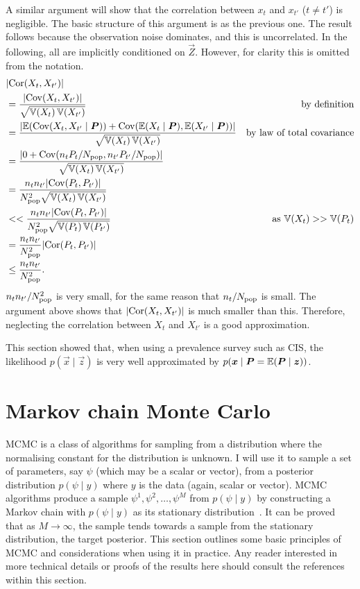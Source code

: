 \documentclass[thesis.tex]{subfiles}
\begin{document}
A similar argument will show that the correlation between $x_t$ and $x_{t'}$ ($t \neq t'$) is negligible.
The basic structure of this argument is as the previous one.
The result follows because the observation noise dominates, and this is uncorrelated.
In the following, all are implicitly conditioned on $\vec{Z}$.
However, for clarity this is omitted from the notation.
\begin{align}
  &\lvert \operatorname{Cor}(X_t, X_{t'}) \rvert \\
  &= \frac{\lvert\operatorname{Cov}(X_t, X_{t'})\rvert}{\sqrt{\operatorname{\mathbb{V}}(X_t) \operatorname{\mathbb{V}}(X_{t'})}} &\text{by definition}\\
  &= \frac{\lvert \operatorname{\mathbb{E}}(\operatorname{Cov}(X_t, X_{t'} \mid \bm{P})) + \operatorname{Cov}(\operatorname{\mathbb{E}}(X_t \mid \bm{P}), \operatorname{\mathbb{E}}(X_{t'} \mid \bm{P})) \rvert}{\sqrt{\operatorname{\mathbb{V}}(X_t) \operatorname{\mathbb{V}}(X_{t'})}} &\text{by law of total covariance} \\
  &= \frac{\lvert 0 + \operatorname{Cov}(n_t P_t / N_\text{pop}, n_{t'} P_{t'} / N_\text{pop}) \rvert}{\sqrt{\operatorname{\mathbb{V}}(X_t) \operatorname{\mathbb{V}}(X_{t'})}} \\
  &= \frac{n_t n_{t'} \lvert \operatorname{Cov}(P_t, P_{t'}) \rvert}{N_\text{pop}^2 \sqrt{\operatorname{\mathbb{V}}(X_t) \operatorname{\mathbb{V}}(X_{t'})}}  \\
  &<< \frac{n_t n_{t'} \lvert \operatorname{Cov}(P_t, P_{t'}) \rvert}{N_\text{pop}^2 \sqrt{\operatorname{\mathbb{V}}(P_t) \operatorname{\mathbb{V}}(P_{t'})}} &\text{as $\operatorname{\mathbb{V}}(X_t) >> \operatorname{\mathbb{V}}(P_t)$} \\
  &= \frac{n_t n_{t'}}{N_\text{pop}^2} \lvert \operatorname{Cor}(P_t, P_{t'}) \rvert \\
  &\leq \frac{n_t n_{t'}}{N_\text{pop}^2}.
\end{align}
$n_t n_{t'} / N_\text{pop}^2$ is very small, for the same reason that $n_t / N_\text{pop}$ is small.
The argument above shows that $\lvert \operatorname{Cor}(X_t, X_{t'}) \rvert$ is much smaller than this.
Therefore, neglecting the correlation between $X_t$ and $X_{t'}$ is a good approximation.

This section showed that, when using a prevalence survey such as CIS, the likelihood $p(\vec{x} \mid \vec{z})$ is very well approximated by $p(\bm{x} \mid \bm{P} = \operatorname{\mathbb{E}}(\bm{P} \mid \bm{z}))$.


\section{Markov chain Monte Carlo} \label{inc-prev:sec:MCMC}

MCMC is a class of algorithms for sampling from a distribution where the normalising constant for the distribution is unknown.
I will use it to sample a set of parameters, say $\psi$ (which may be a scalar or vector), from a posterior distribution $p(\psi \mid y)$ where $y$ is the data (again, scalar or vector).
MCMC algorithms produce a sample $\psi^1, \psi^2, \dots, \psi^M$ from $p(\psi \mid y)$ by constructing a Markov chain with $p(\psi \mid y)$ as its stationary distribution~\autocite[275]{gelmanBDA}.
It can be proved that as $M\to\infty$, the sample tends towards a sample from the stationary distribution, \ie the target posterior.
This section outlines some basic principles of MCMC and considerations when using it in practice.
Any reader interested in more technical details or proofs of the results here should consult the references within this section.
\end{document}
